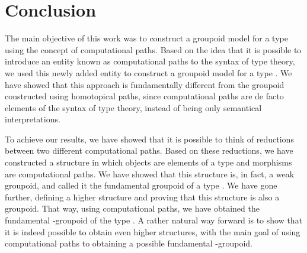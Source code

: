 \documentclass[12pt, a4paper,  oneside, headinclude,footinclude, BCOR5mm]{scrartcl}
\begin{document}
\section{Conclusion}

The main objective of this work was to construct a groupoid model for a type using the concept of computational paths. Based on the idea that it is possible to introduce an entity known as computational paths to the syntax of type theory, we used this newly added entity to construct a groupoid model for a type . We have showed that this approach is fundamentally different from the groupoid constructed using homotopical paths, since computational paths are de facto elements of the syntax of type theory, instead of being only semantical interpretations.

To achieve our results, we have showed that it is possible to think of reductions between two different computational paths. Based on these reductions, we have constructed a structure in which objects are elements of a type  and morphisms are computational paths. We have showed that this structure is, in fact, a weak groupoid, and called it the fundamental groupoid of a type . We have gone further, defining a higher structure and proving that this structure is also a groupoid. That way, using computational paths, we have obtained the fundamental -groupoid of the type . A rather natural way forward is to show that it is indeed possible to obtain even higher structures, with the main goal of using computational paths to obtaining a possible fundamental -groupoid.



\end{document}
